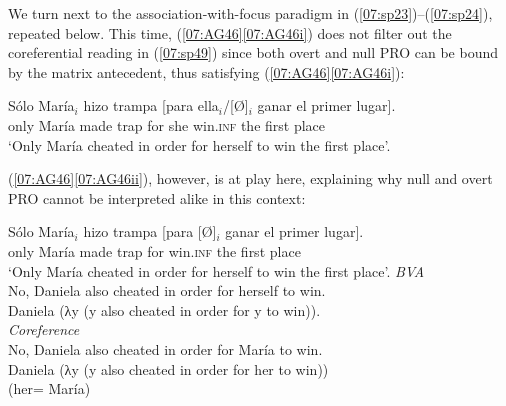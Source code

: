 \documentclass[output=paper,colorlinks,citecolor=brown,draft,draftmode]{langscibook}
\begin{document}
We turn next to the association-with-focus paradigm in (\ref{07:sp23})--(\ref{07:sp24}), repeated below. This time, (\ref{07:AG46}\ref{07:AG46i}) does not filter out the coreferential reading in (\ref{07:sp49}) since both overt and null PRO can be bound by the matrix antecedent, thus satisfying (\ref{07:AG46}\ref{07:AG46i}):

\ea\label{07:sp49}
\gll Sólo María$_i$ hizo trampa [para ella$_i$/[Ø]$_i$ ganar el primer lugar]. \\
only María made trap for she win.\textsc{inf} the first place \\
\glt ‘Only María cheated in order for herself to win the first place’.
\z

(\ref{07:AG46}\ref{07:AG46ii}), however, is at play here, explaining why null and overt PRO cannot be interpreted alike in this context:

\begin{exe}
\ex \label{07:sp50}
\gll Sólo María$_i$ hizo trampa [para [Ø]$_i$ ganar el primer lugar]. \\
only María made trap for {} win.\textsc{inf} the first place \\
\glt ‘Only María cheated in order for herself to win the first place’.
\ea\label{07:sp50a}\cmark\textit{BVA}\\
No, Daniela also cheated in order for herself to win. \\
  Daniela (λy (y also cheated in order for y to win)).\\
\ex\label{07:sp50b}\xmark\textit{Coreference}\\
No, Daniela also cheated in order for María to win.\\
 Daniela (λy (y also cheated in order for her to win))\\
(her= María)\\
\z
\end{exe}
\end{document}
